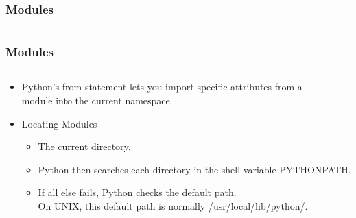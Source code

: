 \documentclass{beamer}
\begin{document}
\begin{frame}[fragile]
	\frametitle{Modules}
	\begin{columns}[c]
		\begin{column}{30cm}
			\vspace{.1cm}
		\end{column}
	\end{columns}
\end{frame}

\begin{frame}
	\frametitle{Modules}
	\begin{columns}[c]
		\begin{column}{30cm}
			\vspace{.1cm}
			\begin{itemize}
				\justifying
				\item Python's from statement lets you import specific attributes from a \\
				 module into the current namespace.
				\item Locating Modules
				\begin{itemize}
					\item The current directory.
					\item Python then searches each directory in the shell variable PYTHONPATH.
					\item If all else fails, Python checks the default path. \\
					On UNIX, this default path is normally /usr/local/lib/python/.
				\end{itemize}
			\end{itemize}
		\end{column}
	\end{columns}
\end{frame}
\end{document}
